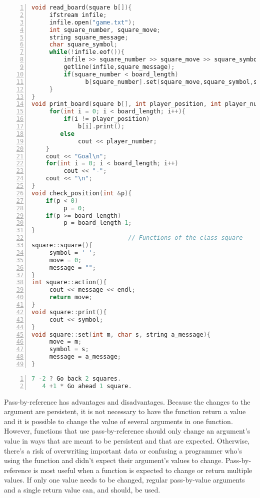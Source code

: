\begin{minipage}{\textwidth}
\renewcommand*\thelstnumber{\the\value{lstnumber}c}
\begin{lstlisting}[language=C++,numbers = left,xleftmargin=4.0ex,basicstyle=\small, emph={current_player,player1_position,player2_position,the_board},emphstyle = \color{\mycolor},
showstringspaces=false,
caption = {The function definitions for the Generic Board Game program.  Some are general functions, while others are member functions of the \cf{square} class.},
label={listing:GenericGameC}]
void read_board(square b[]){
     ifstream infile;
     infile.open("game.txt");
     int square_number, square_move;
     string square_message;
     char square_symbol;
     while(!infile.eof()){
         infile >> square_number >> square_move >> square_symbol;
         getline(infile,square_message);
         if(square_number < board_length)
               b[square_number].set(square_move,square_symbol,square_message);
     }
}
void print_board(square b[], int player_position, int player_number){
     for(int i = 0; i < board_length; i++){
         if(i != player_position)
             b[i].print();
        else
             cout << player_number;
    }
    cout << "Goal\n";
    for(int i = 0; i < board_length; i++)
         cout << "-";
    cout << "\n";
}
void check_position(int &p){
    if(p < 0)
         p = 0;
    if(p >= board_length)
         p = board_length-1;
}
                           // Functions of the class square
square::square(){
     symbol = ' ';
     move = 0;
     message = "";
}
int square::action(){
     cout << message << endl;
     return move;
}
void square::print(){
     cout << symbol;
}
void square::set(int m, char s, string a_message){
     move = m;
     symbol = s;
     message = a_message;
}
\end{lstlisting}
\end{minipage}

\begin{minipage}{\textwidth}
\renewcommand*\thelstnumber{\the\value{lstnumber}d}
\begin{lstlisting}[language=C++,numbers = left, xleftmargin=4.0ex, basicstyle=\small,emph={},emphstyle = \color{\mycolor},
showstringspaces=false,
caption = {The data for the file ``game.txt.''},
label={listing:game.txt}]
   7 -2 ? Go back 2 squares.
   4 +1 * Go ahead 1 square.
\end{lstlisting}
\end{minipage}

Pass-by-reference has advantages and disadvantages.  Because the changes to the argument are persistent, it is not necessary to have the function return a value and it is possible to change the value of several arguments in one function.  However, functions that use pass-by-reference should only change an argument's value in ways that are meant to be persistent and that are expected.  Otherwise, there's a risk of overwriting important data or confusing a programmer who's using the function and didn't expect their argument's values to change.
Pass-by-reference is most useful when a function is expected to change or return multiple values.  If only one value needs to be changed, regular pass-by-value arguments and a single return value can, and should, be used.


